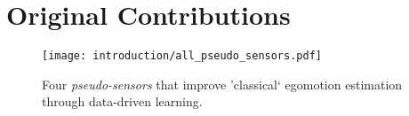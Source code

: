 %
%
% 
\newpage 
\section{Original Contributions}

\begin{figure}[h!]
\begin{center}
		\texttt{[image: introduction/all\_pseudo\_sensors.pdf]}
		\caption{Four \textit{pseudo-sensors} that improve 'classical` egomotion estimation through data-driven learning.}
  	\label{fig:intro_pseudo_sensors}
\end{center}
\end{figure}


